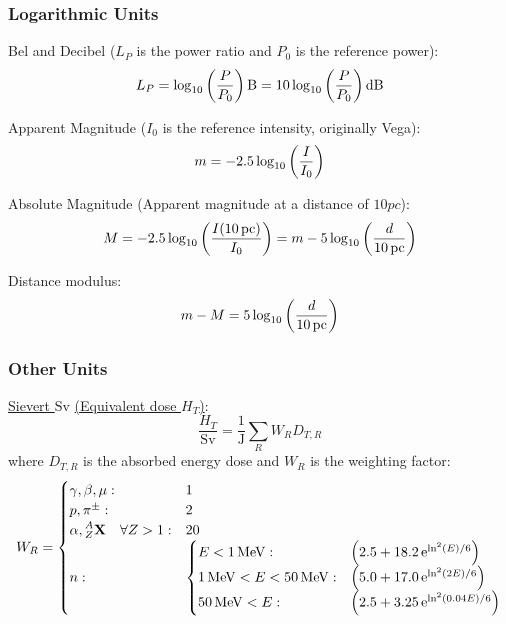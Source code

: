 		\subsubsection{Logarithmic Units}
			\noindent
			Bel and Decibel ($L_P$ is the power ratio and $P_0$ is the reference power):
			\begin{equation}
				L_P = \log_{10}\qty(\frac{P}{P_0})\,\mathrm{B}
				=10\log_{10}\qty(\frac{P}{P_0})\,\mathrm{dB}
			\end{equation}

			\noindent
			Apparent Magnitude ($I_0$ is the reference intensity, originally Vega):
			\begin{equation}
				m = -2.5 \log_{10} \qty( \frac{I}{I_0} )
			\end{equation}

			\noindent
			Absolute Magnitude (Apparent magnitude at a distance of $10\unit{pc}$):
			\begin{equation}
				M = -2.5 \log_{10} \qty( \frac{I(10\,\mathrm{pc})}{I_0} ) = m - 5 \log_{10} \qty( \frac{d}{10\,\mathrm{pc}} )
			\end{equation}

			\noindent
			Distance modulus:
			\begin{equation}
				m - M = 5 \log_{10} \qty( \frac{d}{10\,\mathrm{pc}} )
			\end{equation}

		\subsubsection{Other Units}
			\href{https://en.wikipedia.org/wiki/Sievert}{Sievert $\mathrm{Sv}$} \href{https://en.wikipedia.org/wiki/Equivalent_dose}{(Equivalent dose $H_T$)}:
			\begin{equation}
				\frac{H_T}{\mathrm{Sv}} = \frac{1}{\mathrm{J}}\sum_R W_R D_{T,R}
			\end{equation}
			where $D_{T,R}$ is the absorbed energy dose and $W_R$ is the weighting factor:
			\begin{equation}
				\begin{aligned}
					W_R =
					\begin{cases}
						\gamma,\beta,\mu: & 1 \\
						p, \pi^\pm: & 2 \\
						\alpha, \prescript{A}{Z}{\mathbf{X}}\quad\forall Z>1: & 20 \\
						n: &\begin{cases}
							E<1\,\mathrm{MeV}: & \qty(2.5+18.2 \,\mathrm{e}^{\ln^2(E)/6}) \\
							1\,\mathrm{MeV} <E<50\,\mathrm{MeV}: & \qty(5.0+17.0 \,\mathrm{e}^{\ln^2(2E)/6}) \\
							50\,\mathrm{MeV}<E: & \qty(2.5+3.25 \,\mathrm{e}^{\ln^2(0.04E)/6}) \\
						\end{cases}
					\end{cases}\\
				\end{aligned}
			\end{equation}

